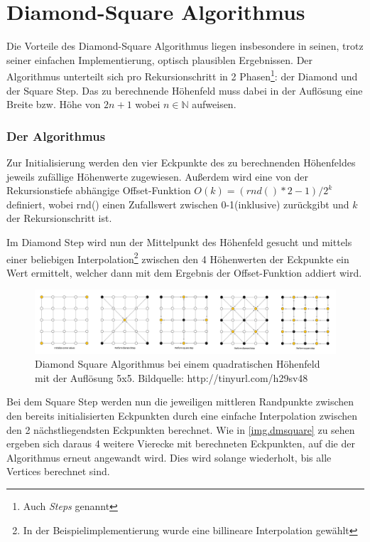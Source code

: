 \chapter{Diamond-Square Algorithmus}\label{diamondsquare}
Die Vorteile des Diamond-Square Algorithmus liegen insbesondere in seinen, trotz seiner einfachen Implementierung, optisch plausiblen Ergebnissen. 
Der Algorithmus unterteilt sich pro Rekursionschritt in 2 Phasen\footnote{Auch \emph{Steps} genannt}: der Diamond und der Square Step. Das zu berechnende Höhenfeld muss dabei in der Auflösung eine Breite bzw. Höhe von $2n+1$ wobei $ n\in\mathbb{N}$ aufweisen.

\subsection{Der Algorithmus}
Zur Initialisierung werden den vier Eckpunkte des zu berechnenden Höhenfeldes jeweils zufällige Höhenwerte zugewiesen. Außerdem wird eine von der Rekursionstiefe abhängige Offset-Funktion $O(k)=(rnd()*2-1)/2^k$ definiert, wobei rnd() einen Zufallswert zwischen 0-1(inklusive) zurückgibt und $k$ der Rekursionschritt ist.

Im Diamond Step wird nun der Mittelpunkt des Höhenfeld gesucht und mittels einer beliebigen Interpolation\footnote{In der Beispielimplementierung wurde eine billineare Interpolation gewählt} zwischen den 4 Höhenwerten der Eckpunkte ein Wert ermittelt, welcher dann mit dem Ergebnis der Offset-Funktion addiert wird.
\begin{figure}
	\centering
	\includegraphics[width=\textwidth]{images/Diamond_Square.png}
	\caption{Diamond Square Algorithmus bei einem quadratischen Höhenfeld mit der Auflösung 5x5. Bildquelle: http://tinyurl.com/h29sv48}\label{img.dmsquare}
\end{figure}
Bei dem Square Step werden nun die jeweiligen mittleren Randpunkte zwischen den bereits initialisierten Eckpunkten durch eine einfache Interpolation zwischen den 2 nächstliegendsten Eckpunkten berechnet.
Wie in \autoref{img.dmsquare} zu sehen ergeben sich daraus 4 weitere Vierecke mit berechneten Eckpunkten, auf die der Algorithmus erneut angewandt wird. Dies wird solange wiederholt, bis alle Vertices berechnet sind.
